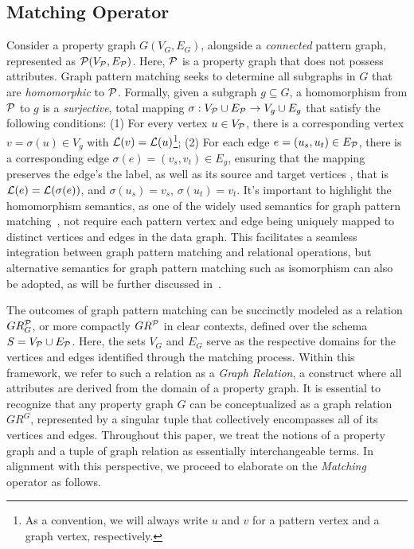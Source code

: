 
\subsection{Matching Operator}
\label{sec:matching-operator}
Consider a property graph \(G(V_G, E_G)\), alongside a \emph{connected} pattern graph, represented as \(\mathcal{P}(V_{\mathcal{P}}, E_{\mathcal{P}})\). Here, \(\mathcal{P}\) is a property graph that does not possess attributes.
Graph pattern matching seeks to determine all subgraphs in \(G\) that are \emph{homomorphic} to \(\mathcal{P}\).
Formally, given a subgraph $g \subseteq G$, a homomorphism from \(\mathcal{P}\) to \(g\) is a \emph{surjective}, total mapping \(\sigma: V_{\mathcal{P}} \cup E_{\mathcal{P}} \to V_{g} \cup E_{g}\) that satisfy the following conditions: (1) For every vertex \(u \in V_{\mathcal{P}}\), there is a corresponding vertex \(v = \sigma(u) \in V_{g}\) with \(\mathcal{L}(v) = \mathcal{L}(u)\)\footnote{As a convention, we will always write $u$ and $v$ for a pattern vertex and a graph vertex, respectively.}; (2) For each edge \(e = (u_s, u_t) \in E_{\mathcal{P}}\), there is a corresponding edge \(\sigma(e) = (v_s, v_t) \in E_{g}\), ensuring that the mapping preserves the edge's the label, as well as its source and target vertices , that is \(\mathcal{L}(e) = \mathcal{L}(\sigma(e))\), and \(\sigma(u_s) = v_s\), \(\sigma(u_t) = v_t\). It's important to highlight the homomorphism semantics, as one of the widely used semantics for graph pattern matching~\cite{angles2017foundations},  not require each pattern vertex and edge being uniquely mapped to distinct vertices and edges in the data graph. This facilitates a seamless integration between graph pattern matching and relational operations, but alternative semantics for graph pattern matching such as isomorphism can also be adopted, as will be further discussed in~.

The outcomes of graph pattern matching can be succinctly modeled as a relation \(GR_G^{\mathcal{P}}\), or more compactly \(GR^{\mathcal{P}}\) in clear contexts, defined over the schema \(S = V_{\mathcal{P}} \cup E_{\mathcal{P}}\). Here, the sets \(V_G\) and \(E_G\) serve as the respective domains for the vertices and edges identified through the matching process. Within this framework, we refer to such a relation as a \emph{Graph Relation}, a construct where all attributes are derived from the domain of a property graph.
It is essential to recognize that any property graph \(G\) can be conceptualized as a graph relation \(GR^G\), represented by a singular tuple that collectively encompasses all of its vertices and edges. Throughout this paper, we treat the notions of a property graph and a tuple of graph relation as essentially interchangeable terms. In alignment with this perspective, we proceed to elaborate on the \emph{Matching} operator as follows.

